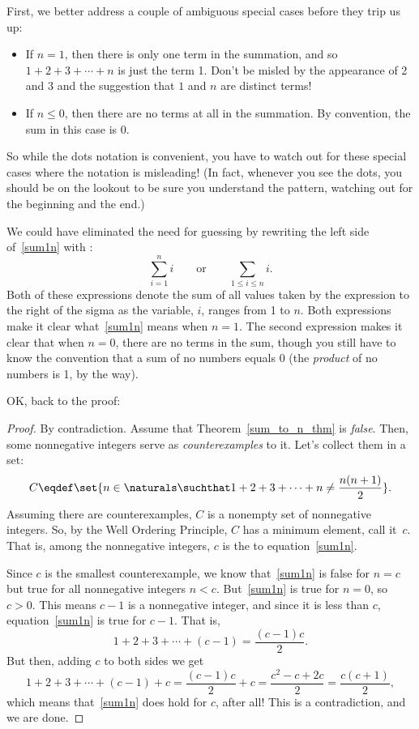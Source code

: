 First, we better address a couple of ambiguous special
cases before they trip us up:
%
\begin{itemize}
%
\item If $n = 1$, then there is only one term in the summation, and so $1
  + 2 + 3 + \cdots + n$ is just the term 1.  Don't be misled by the
  appearance of 2 and 3 and the suggestion that $1$ and $n$ are distinct
  terms!
%
\item If $n \leq 0$, then there are no terms at all in the summation.  By
convention, the sum in this case is 0.
%
\end{itemize}
%
So while the dots notation is convenient, you have to watch out for these
special cases where the notation is misleading!  (In fact, whenever you
see the dots, you should be on the lookout to be sure you understand the
pattern, watching out for the beginning and the end.)

We could have eliminated the need for guessing by rewriting the left side
of~\eqref{sum1n} with :
\[
\sum_{i=1}^n i
\qquad \text{or} \qquad
\sum_{1 \leq i \leq n} i.
\]
Both of these expressions denote the sum of all values taken by the
expression to the right of the sigma as the variable, $i$, ranges from 1
to $n$.  Both expressions make it clear what~\eqref{sum1n} means when
$n=1$.  The second expression makes it clear that when $n=0$, there are no
terms in the sum, though you still have to know the convention that a sum
of no numbers equals 0 (the \emph{product} of no numbers is 1, by the
way).

OK, back to the proof:

\begin{proof}
By contradiction.  Assume that Theorem~\ref{sum_to_n_thm} is
\emph{false}.  Then, some nonnegative integers serve as
\emph{counterexamples} to it. Let's collect them in a set:
\[
C \eqdef \set{n\in\naturals \suchthat 
        1 + 2 + 3 + \cdots + n \neq \frac{n(n+1)}{2}}.
\]
Assuming there are counterexamples, $C$ is a nonempty set of
nonnegative integers.  So, by the Well Ordering Principle, $C$ has a
minimum element, call it~$c$.  That is, among the nonnegative
integers, $c$ is the \emph{} to
equation~\eqref{sum1n}.

Since $c$ is the smallest counterexample, we know that~\eqref{sum1n} is
false for $n=c$ but true for all nonnegative integers $n<c$.
But~\eqref{sum1n} is true for $n=0$, so $c > 0$.  This means $c-1$ is a
nonnegative integer, and since it is less than $c$, equation~\eqref{sum1n}
is true for $c-1$.  That is,
\[
        1 + 2 + 3 + \cdots + (c-1) = \frac{(c-1)c}{2}.
\]
But then, adding $c$ to both sides we get
\[
1 + 2 + 3 + \cdots + (c-1) + c 
        = \frac{(c-1)c}{2} + c
        = \frac{c^2 - c + 2c}{2} 
        = \frac{c(c+1)}{2},
\]
which means that~\eqref{sum1n} does hold for $c$, after all!  This is a
contradiction, and we are done.
\end{proof}


